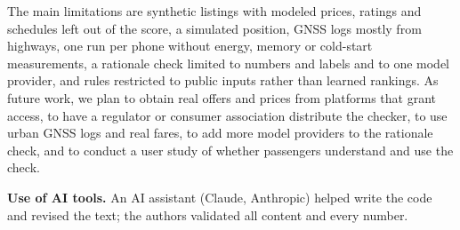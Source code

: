 \documentclass{svproc}
\begin{document}
The main limitations are synthetic listings with modeled prices, ratings and schedules left out of the score, a simulated position, GNSS logs mostly from highways, one run per phone without energy, memory or cold-start measurements, a rationale check limited to numbers and labels and to one model provider, and rules restricted to public inputs rather than learned rankings. As future work, we plan to obtain real offers and prices from platforms that grant access, to have a regulator or consumer association distribute the checker, to use urban GNSS logs and real fares, to add more model providers to the rationale check, and to conduct a user study of whether passengers understand and use the check.

\noindent\textbf{Use of AI tools.} An AI assistant (Claude, Anthropic) helped write the code and revised the text; the authors validated all content and every number.



\end{document}
